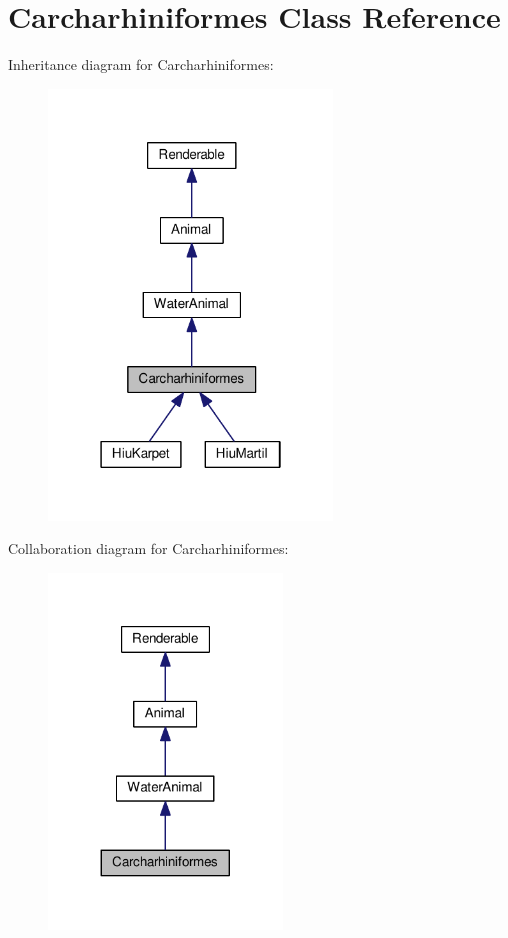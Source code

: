 \hypertarget{classCarcharhiniformes}{}\section{Carcharhiniformes Class Reference}
\label{classCarcharhiniformes}


Inheritance diagram for Carcharhiniformes\+:
\nopagebreak
\begin{figure}[H]
\begin{center}
\leavevmode
\includegraphics[width=214pt]{classCarcharhiniformes__inherit__graph}
\end{center}
\end{figure}


Collaboration diagram for Carcharhiniformes\+:
\nopagebreak
\begin{figure}[H]
\begin{center}
\leavevmode
\includegraphics[width=176pt]{classCarcharhiniformes__coll__graph}
\end{center}
\end{figure}
